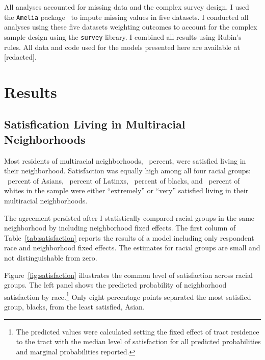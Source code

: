 \documentclass{baderart}
\begin{document}
All analyses accounted for missing data and the complex survey design. I used the \texttt{Amelia} package~\citep{honaker_amelia_2011} to impute missing values in five datasets. I conducted all analyses using these five datasets weighting outcomes to account for the complex sample design using the \texttt{survey} library. I combined all results using Rubin's~\citeyearpar{rubin_multiple_2004} rules. All data and code used for the models presented here are available at [redacted].

\section{Results}\label{results}

\subsection{Satisfication Living in Multiracial Neighborhoods}\label{satisfication-living-in-multiracial-neighborhoods}

Most residents of multiracial neighborhoods, \meansatisfied\ percent, were satisfied living in their neighborhood. Satisfaction was equally high among all four racial groups: \apisatisfied\ percent of Asians, \hspsatisfied\ percent of Latinxs, \nhbsatisfied\ percent of blacks, and \nhwsatisfied\ percent of whites in the sample were either ``extremely'' or ``very'' satisfied living in their multiracial neighborhoods.

The agreement persisted after I statistically compared racial groups in the same neighborhood by including neighborhood fixed effects. The first column of Table~\ref{tab:satisfaction} reports the results of a model including only respondent race and neighborhood fixed effects. The estimates for racial groups are small and not distinguishable from zero.


Figure~\ref{fig:satisfaction} illustrates the common level of satisfaction across racial groups. The left panel shows the predicted probability of neighborhood satisfaction by race.\footnote{The predicted values were calculated setting the fixed effect of tract residence to the tract with the median level of satisfaction for all predicted probabilities and marginal probabilities reported.} Only eight percentage points separated the most satisfied group, blacks, from the least satisfied, Asian.

\end{document}

